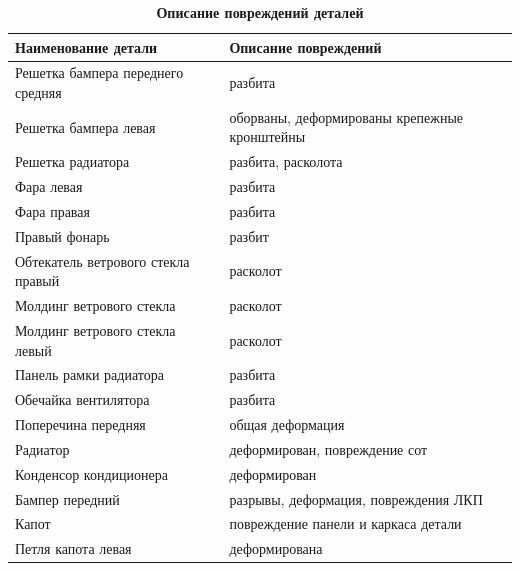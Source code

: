 {\small \begin{table}[H]
		\begin{longtable}{@{}ll@{}}
			\caption[]{\footnotesize {\textbf{Описание повреждений деталей}}} \label{tab:5}\\ 
			\toprule
			\textbf{	Наименование детали       }               &\textbf{ Описание повреждений}                         \\ \midrule
			Решетка бампера переднего средняя        & разбита                                      \\
			Решетка бампера левая                    & оборваны, деформированы крепежные кронштейны \\
			Решетка радиатора                        & разбита, расколота                           \\
			Фара левая                               & разбита                                      \\
			Фара правая                              & разбита                                      \\
			Правый фонарь                            & разбит                                       \\
			Обтекатель ветрового стекла правый       & расколот                                     \\
			Молдинг ветрового стекла                 & расколот                                     \\
			Молдинг ветрового стекла левый           & расколот                                     \\
			Панель рамки радиатора                   & разбита                                      \\
			Обечайка вентилятора                     & разбита                                      \\
			Поперечина передняя                      & общая деформация                             \\
			Радиатор                                 & деформирован, повреждение сот                \\
			Конденсор кондиционера                   & деформирован                                 \\
			Бампер передний                          & разрывы, деформация, повреждения ЛКП         \\
			Капот                                    & повреждение панели и каркаса детали          \\
			Петля капота левая                       & деформирована                                \\

\end{longtable}
\end{table}}
